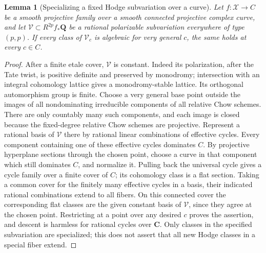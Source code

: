 \documentclass[10pt,reqno]{article}
\theoremstyle{emphasizedplain}
\newtheorem{lemma}[theorem]{Lemma}
\theoremstyle{emphasizeddefinition}
\theoremstyle{emphasizeddefinition}
\newcommand{\Q}{\mathbf Q}
\newcommand{\C}{\mathbf C}
\begin{document}
\begin{lemma}[Specializing a fixed Hodge subvariation over a curve]
\label{p:curve-specialization}
Let $f:\mathcal X\to C$ be a smooth projective family over a smooth
connected projective complex curve, and let $\mathcal V\subset R^{2p}f_*\Q$
be a rational polarizable subvariation everywhere of type $(p,p)$.
If every class of $\mathcal V_c$ is algebraic for very general $c$,
the same holds at every $c\in C$.
\end{lemma}
\begin{proof}
After a finite etale cover, $\mathcal V$ is constant. Indeed its
polarization, after the Tate twist, is positive definite and preserved
by monodromy; intersection with an integral cohomology lattice gives
a monodromy-stable lattice. Its orthogonal automorphism group is finite.
Choose a very general base point outside the images of all
nondominating irreducible components of all relative Chow schemes.
There are only countably many such components, and each image is
closed because the fixed-degree relative Chow schemes are projective.
Represent a rational basis of $\mathcal V$ there by rational linear
combinations of effective cycles. Every component containing one of
these effective cycles dominates $C$. By projective hyperplane sections
through the chosen point, choose a curve in that component which still
dominates $C$, and normalize it. Pulling back the universal cycle gives
a cycle family over a finite cover of $C$; its cohomology class is a
flat section. Taking a common cover for the finitely many effective
cycles in a basis, their indicated rational combinations extend to
all fibers. On this connected cover the corresponding flat classes
are the given constant basis of $\mathcal V$, since they agree at the
chosen point. Restricting at a point over any desired $c$ proves the
assertion, and descent is harmless for rational cycles over $\C$.
Only classes in the specified subvariation are specialized; this does
not assert that all new Hodge classes in a special fiber extend.
\end{proof}
\end{document}
